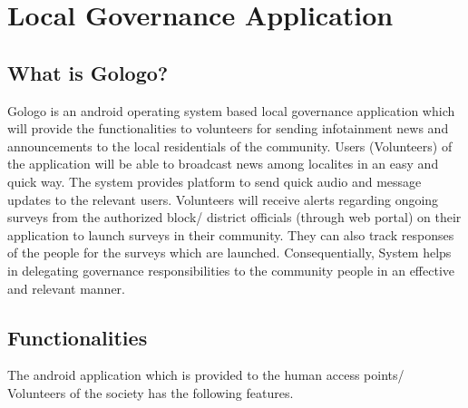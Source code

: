 \chapter {Local Governance Application}

\section {What is Gologo?}

Gologo is an android operating system based local governance application which will provide the functionalities to volunteers for sending infotainment news and announcements to the local residentials of the community. Users (Volunteers) of the application will be able to broadcast news among localites in an easy and quick way.  The system provides platform to send quick audio and message updates to the relevant users. Volunteers will receive alerts regarding ongoing surveys from the authorized block/ district officials (through web portal)  on their application to launch surveys in their community. They can also track responses of the people for the surveys which are launched. Consequentially, System helps in delegating governance responsibilities to the community people in an effective and relevant manner.

\section {Functionalities}
The android application which is provided to the human access points/ Volunteers of the society has the following features.

